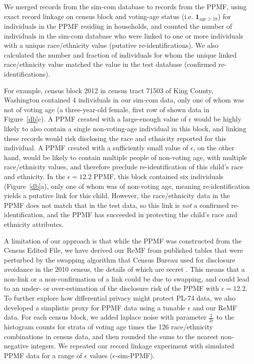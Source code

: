 \documentclass{article}
\begin{document}
We merged records from the sim-com database to records from the PPMF, using exact record linkage on census block and voting-age status (i.e. $\mathbf{1}_{\mathrm{age} \geq 18}$) for individuals in the PPMF residing in households, and counted the number of individuals in the sim-com database who were linked to one or more individuals with a unique race/ethnicity value (putative re-identifications).  We also calculated the number and fraction of individuals for whom the unique linked race/ethnicity value matched the value in the test database (confirmed re-identifications).

For example, census block 2012 in census tract 71503 of King County, Washington contained 4 individuals in our sim-com data, only one of whom was not of voting age (a three-year-old female, first row of shown data in Figure~\ref{db}c).  A PPMF created with a large-enough value of $\epsilon$ would be highly likely to also contain a single non-voting-age individual in this block, and linking these records would risk disclosing the race and ethnicity reported for this individual. A PPMF created with a sufficiently small value of $\epsilon$, on the other hand, would be likely to contain multiple people of non-voting age, with multiple race/ethnicity values, and therefore preclude re-identification of this child's race and ethnicity. In the $\epsilon=12.2$ PPMF, this block contained six individuals (Figure~\ref{db}a), only one of whom was of non-voting age, meaning re-identification yields a putative link for this child. However, the race/ethnicity data in the PPMF does not match that in the test data, so this link is \emph{not} a confirmed re-identification, and the PPMF has succeeded in protecting the child's race and ethnicity attributes.

A limitation of our approach is that while the PPMF was constructed from the Census Edited File, we have derived our ReMF from published tables that were perturbed by the swapping algorithm that Census Bureau used for disclosure avoidance in the 2010 census, the details of which are secret \cite{mckenna2018disclosure}.   This means that a non-link or a non-confirmation of a link could be due to swapping, and could lead to an under- or over-estimation of the disclosure risk of the PPMF with $\epsilon=12.2$.  To further explore how differential privacy might protect PL-74 data, we also developed a simplistic proxy for PPMF data using a tunable $\epsilon$ and our ReMF data.  For each census block, we added laplace noise with parameter $\frac{1}{2\epsilon}$ to the histogram counts for strata of voting age times the 126 race/ethnicity combinations in census data, and then rounded the sums to the nearest non-negative integers.  We repeated our record linkage experiment with simulated PPMF data for a range of $\epsilon$ values ($\epsilon$-sim-PPMF).
\end{document}
